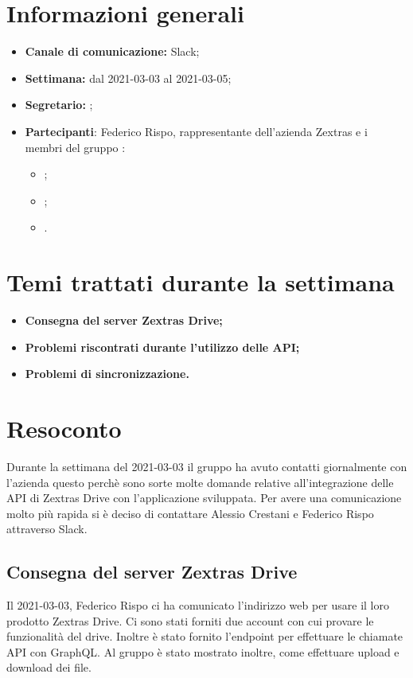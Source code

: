 \section{Informazioni generali}

\begin{itemize}

    \item \textbf{Canale di comunicazione:} Slack;

    \item \textbf{Settimana:} dal 2021-03-03 al 2021-03-05;

    \item \textbf{Segretario:} \Davide{};

    \item \textbf{Partecipanti}: Federico Rispo, rappresentante dell'azienda Zextras e i membri del gruppo \Gruppo{}:
        \begin{itemize}
            \item \Daniele{};
            \item \Davide{};
            \item \Matteo{}.
        \end{itemize}

\end{itemize}
\section{Temi trattati durante la settimana}

\begin{itemize}
    \item\textbf{Consegna del server Zextras Drive;}
    \item\textbf{Problemi riscontrati durante l'utilizzo delle API;}
    \item\textbf{Problemi di sincronizzazione.}
\end{itemize}
\newpage


\section{Resoconto}
Durante la settimana del 2021-03-03 il gruppo \textit{\Gruppo{}} ha avuto contatti giornalmente con l'azienda questo perchè sono sorte molte domande relative all'integrazione delle API di Zextras Drive con l'applicazione sviluppata.
Per avere una comunicazione molto più rapida si è deciso di contattare Alessio Crestani e Federico Rispo attraverso Slack.

\subsection{Consegna del server Zextras Drive}
Il 2021-03-03, Federico Rispo ci ha comunicato l'indirizzo web per usare il loro prodotto Zextras Drive. Ci sono stati forniti due account con cui provare le funzionalità del drive.
Inoltre è stato fornito l'endpoint per effettuare le chiamate API con GraphQL. Al gruppo è stato mostrato inoltre, come effettuare upload e download dei file.

